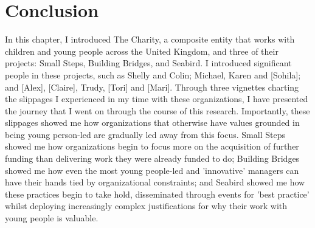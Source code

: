 \section{Conclusion}

In this chapter, I introduced The Charity, a composite entity that works with children and young people across the United Kingdom, and three of their projects: Small Steps, Building Bridges, and Seabird. I introduced significant people in these projects, such as Shelly and Colin; Michael, Karen and [Sohila]; and [Alex], [Claire], Trudy, [Tori] and [Mari]. Through three vignettes charting the slippages I experienced in my time with these organizations, I have presented the journey that I went on through the course of this research. Importantly, these slippages showed me how organizations that otherwise have values grounded in being young person-led are gradually led away from this focus. Small Steps showed me how organizations begin to focus more on the acquisition of further funding than delivering work they were already funded to do; Building Bridges showed me how even the most young people-led and 'innovative' managers can have their hands tied by organizational constraints; and Seabird showed me how these practices begin to take hold, disseminated through events for 'best practice' whilst deploying increasingly complex justifications for why their work with young people is valuable. 